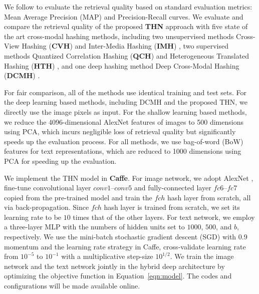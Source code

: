 \documentclass{article}
\begin{document}
We follow \cite{cite:KDD14HTH} to evaluate the retrieval quality based on standard evaluation metrics: Mean Average Precision (MAP) and Precision-Recall curves. We evaluate and compare the retrieval quality of the proposed \textbf{THN} approach with five state of the art cross-modal hashing methods, including two unsupervised methods Cross-View Hashing (\textbf{CVH}) \cite{cite:IJCAI11CVH} and Inter-Media Hashing (\textbf{IMH}) \cite{cite:SIGMOD13IMH}, two supervised methods Quantized Correlation Hashing (\textbf{QCH}) \cite{cite:IJCAI15QCH} and Heterogeneous Translated Hashing (\textbf{HTH}) \cite{cite:KDD14HTH}, and one deep hashing method Deep Cross-Modal Hashing (\textbf{DCMH}) \cite{cite:JDCMH16}. 

For fair comparison, all of the methods use identical training and test sets. For the deep learning based methods, including DCMH and the proposed THN, we directly use the image pixels as input. For the shallow learning based methods, we reduce the 4096-dimensional AlexNet features \cite{cite:ICML14DeCAF} of images to 500 dimensions using PCA, which incurs negligible loss of retrieval quality but significantly speeds up the evaluation process. For all methods, we use bag-of-word (BoW) features for text representations, which are reduced to 1000 dimensions using PCA for speeding up the evaluation.

We implement the THN model in \textbf{Caffe}. For image network, we adopt  AlexNet \cite{cite:NIPS12CNN}, fine-tune convolutional layer $conv1$--$conv5$ and fully-connected layer $fc6$--$fc7$ copied from the pre-trained model and train the $fch$ hash layer from scratch, all via back-propagation. Since $fch$ hash layer is trained from scratch, we set its learning rate to be $10$ times that of the other layers. For text network, we employ a three-layer MLP with the numbers of hidden units set to $1000$, $500$, and $b$, respectively. We use the mini-batch stochastic gradient descent (SGD) with $0.9$ momentum and the learning rate strategy in Caffe, cross-validate learning rate from $10^{-5}$ to $10^{-1}$ with a multiplicative step-size $10^{1/2}$. We train the image network and the text network jointly in the hybrid deep architecture by optimizing the objective function in Equation~\eqref{eqn:model}. The codes and configurations will be made available online.
\end{document}
